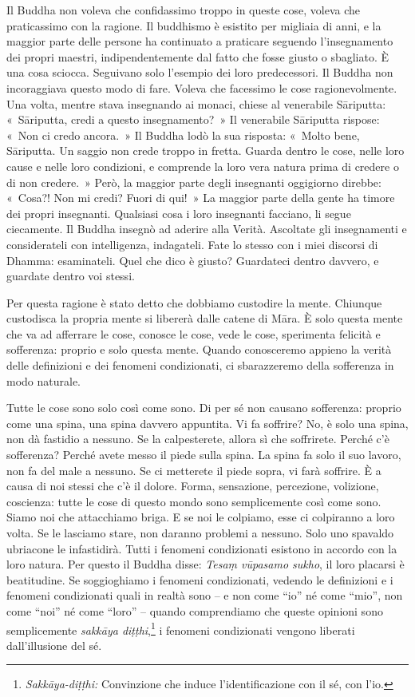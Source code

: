 Il Buddha non voleva che confidassimo troppo in queste cose, voleva che
praticassimo con la ragione. Il buddhismo è esistito per migliaia di
anni, e la maggior parte delle persone ha continuato a praticare
seguendo l'insegnamento dei propri maestri, indipendentemente dal fatto
che fosse giusto o sbagliato. È una cosa sciocca. Seguivano solo
l'esempio dei loro predecessori. Il Buddha non incoraggiava questo modo
di fare. Voleva che facessimo le cose ragionevolmente. Una volta, mentre
stava insegnando ai monaci, chiese al venerabile Sāriputta: «~Sāriputta,
credi a questo insegnamento?~» Il venerabile Sāriputta rispose: «~Non ci
credo ancora.~» Il Buddha lodò la sua risposta: «~Molto bene, Sāriputta.
Un saggio non crede troppo in fretta. Guarda dentro le cose, nelle loro
cause e nelle loro condizioni, e comprende la loro vera natura prima di
credere o di non credere.~» Però, la maggior parte degli insegnanti
oggigiorno direbbe: «~Cosa?! Non mi credi? Fuori di qui!~» La maggior
parte della gente ha timore dei propri insegnanti. Qualsiasi cosa i loro
insegnanti facciano, li segue ciecamente. Il Buddha insegnò ad aderire
alla Verità. Ascoltate gli insegnamenti e considerateli con
intelligenza, indagateli. Fate lo stesso con i miei discorsi di Dhamma:
esaminateli. Quel che dico è giusto? Guardateci dentro davvero, e
guardate dentro voi stessi.

Per questa ragione è stato detto che dobbiamo custodire la mente.
Chiunque custodisca la propria mente si libererà dalle catene di Māra. È
solo questa mente che va ad afferrare le cose, conosce le cose, vede le
cose, sperimenta felicità e sofferenza: proprio e solo questa mente.
Quando conosceremo appieno la verità delle definizioni e dei fenomeni
condizionati, ci sbarazzeremo della sofferenza in modo naturale.

Tutte le cose sono solo così come sono. Di per sé non causano
sofferenza: proprio come una spina, una spina davvero appuntita. Vi fa
soffrire? No, è solo una spina, non dà fastidio a nessuno. Se la
calpesterete, allora sì che soffrirete. Perché c'è sofferenza? Perché
avete messo il piede sulla spina. La spina fa solo il suo lavoro, non fa
del male a nessuno. Se ci metterete il piede sopra, vi farà soffrire. È
a causa di noi stessi che c'è il dolore. Forma, sensazione, percezione,
volizione, coscienza: tutte le cose di questo mondo sono semplicemente
così come sono. Siamo noi che attacchiamo briga. E se noi le colpiamo,
esse ci colpiranno a loro volta. Se le lasciamo stare, non daranno
problemi a nessuno. Solo uno spavaldo ubriacone le infastidirà. Tutti i
fenomeni condizionati esistono in accordo con la loro natura. Per questo
il Buddha disse: \emph{Tesaṃ vūpasamo sukho}, il loro placarsi è
beatitudine. Se soggioghiamo i fenomeni condizionati, vedendo le
definizioni e i fenomeni condizionati quali in realtà sono -- e non come
``io'' né come ``mio'', non come ``noi'' né come ``loro'' -- quando
comprendiamo che queste opinioni sono semplicemente \emph{sakkāya
diṭṭhi},\footnote{\emph{Sakkāya-diṭṭhi:} Convinzione che induce
  l'identificazione con il sé, con l'io.} i fenomeni condizionati
vengono liberati dall'illusione del sé.

